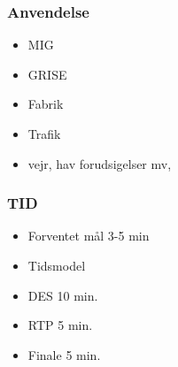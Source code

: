 \documentclass{beamer}
\begin{document}
\begin{frame}
  \frametitle{Anvendelse}
  \begin{itemize}
	\item MIG
	\item GRISE
	\item Fabrik
	\item Trafik
	\item vejr, hav forudsigelser mv,
  \end{itemize}
\end{frame}


\begin{frame}
  \frametitle{TID}
  \begin{itemize}
	\item Forventet mål 3-5 min
	\item Tidsmodel
	\item DES 10 min.
	\item RTP 5 min.
	\item Finale 5 min.
  \end{itemize}
\end{frame}
\end{document}
